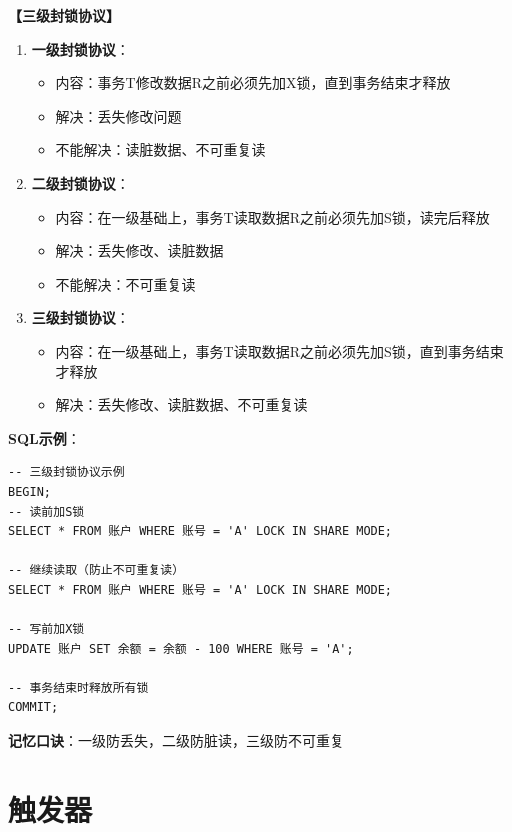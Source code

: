 \documentclass[12pt, a4paper]{article}
\newenvironment{bluebox}[1]{%
  \begin{trivlist}
  \item[\hskip\labelsep \textbf{#1}]
  \setlength{\parskip}{0.5ex}
  \setlength{\itemsep}{0.5ex}
}{%
  \end{trivlist}
  }
\begin{document}
\begin{bluebox}{封锁协议}
	\textbf{【三级封锁协议】}

	\begin{enumerate}[leftmargin=*, label=\textbf{\arabic*.}]
		\item \textbf{一级封锁协议}：
		      \begin{itemize}[nosep]
			      \item 内容：事务T修改数据R之前必须先加X锁，直到事务结束才释放
			      \item 解决：丢失修改问题
			      \item 不能解决：读脏数据、不可重复读
		      \end{itemize}

		\item \textbf{二级封锁协议}：
		      \begin{itemize}[nosep]
			      \item 内容：在一级基础上，事务T读取数据R之前必须先加S锁，读完后释放
			      \item 解决：丢失修改、读脏数据
			      \item 不能解决：不可重复读
		      \end{itemize}

		\item \textbf{三级封锁协议}：
		      \begin{itemize}[nosep]
			      \item 内容：在一级基础上，事务T读取数据R之前必须先加S锁，直到事务结束才释放
			      \item 解决：丢失修改、读脏数据、不可重复读
		      \end{itemize}
	\end{enumerate}

	\textbf{SQL示例}：
	\begin{verbatim}
-- 三级封锁协议示例
BEGIN;
-- 读前加S锁
SELECT * FROM 账户 WHERE 账号 = 'A' LOCK IN SHARE MODE;

-- 继续读取（防止不可重复读）
SELECT * FROM 账户 WHERE 账号 = 'A' LOCK IN SHARE MODE;

-- 写前加X锁
UPDATE 账户 SET 余额 = 余额 - 100 WHERE 账号 = 'A';

-- 事务结束时释放所有锁
COMMIT;
	\end{verbatim}

	\textbf{记忆口诀}：一级防丢失，二级防脏读，三级防不可重复
\end{bluebox}

\section{触发器}
\end{document}
